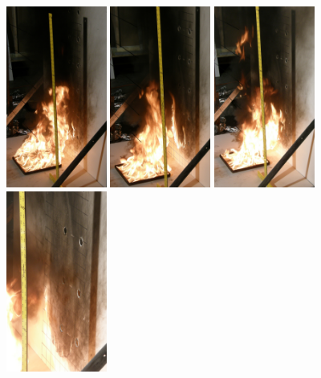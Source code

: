 \documentclass[twoside]{uocthesis}
\begin{document}
{\begin{figure}[p]
	\includegraphics[width=1.3in]{../Figures/IWGBGAS6_Seq5}
	\includegraphics[width=1.3in]{../Figures/IWGBGAS6_Seq6}
	\includegraphics[width=1.3in]{../Figures/IWGBGAS6_Seq7}
	\includegraphics[width=1.3in]{../Figures/IWGBGAS6_Seq8} \\


\end{figure}}
\end{document}
